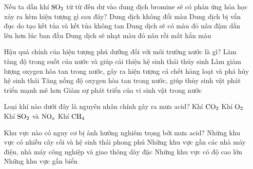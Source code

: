 \documentclass[12pt,a4paper]{article}
\begin{document}
\begin{ex}
Nếu ta dẫn khí $\ce{SO2}$ từ từ đến dư vào dung dịch bromine sẽ có phản ứng hóa học xảy ra kèm hiện tượng gì sau đây?
\choice
{Dung dịch không đổi màu}
{Dung dịch bị vẩn đục do tạo kết tủa và kết tủa không tan}
{Dung dịch sẽ có màu đỏ nâu đậm dần lên hơn lúc ban đầu}
{\True Dung dịch sẽ nhạt màu đỏ nâu rồi mất hẳn màu}

\end{ex}

\begin{ex}
Hậu quả chính của hiện tượng phú dưỡng đối với môi trường nước là gì?
\choice
{Làm tăng độ trong suốt của nước và giúp cải thiện hệ sinh thái thủy sinh}
{\True Làm giảm lượng oxygen hòa tan trong nước, gây ra hiện tượng cá chết hàng loạt và phá hủy hệ sinh thái}
{Tăng nồng độ oxygen hòa tan trong nước, giúp thủy sinh vật phát triển mạnh mẽ hơn}
{Giảm sự phát triển của vi sinh vật trong nước}

\end{ex}

\begin{ex}
Loại khí nào dưới đây là nguyên nhân chính gây ra mưa acid?
\choice
{Khí $\ce{CO2}$}
{Khí $\ce{O2}$}
{\True Khí $\ce{SO2}$ và $\ce{NO_x}$}
{Khí $\ce{CH4}$}

\end{ex}

\begin{ex}
Khu vực nào có nguy cơ bị ảnh hưởng nghiêm trọng bởi mưa acid?
\choice
{Những khu vực có nhiều cây cối và hệ sinh thái phong phú}
{\True Những khu vực gần các nhà máy điện, nhà máy công nghiệp và giao thông dày đặc}
{Những khu vực có độ cao lớn}
{Những khu vực gần biển}

\end{ex}
\end{document}

